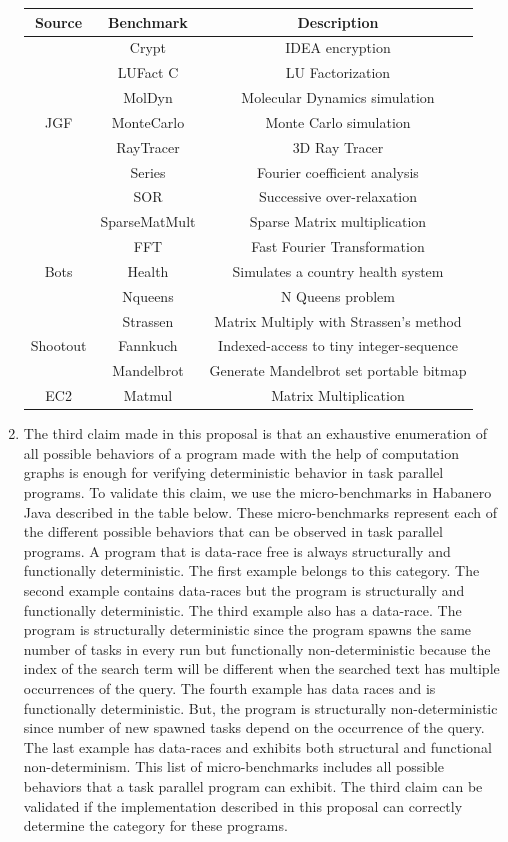 \begin{enumerate}
\begin{tabular}{|c|c|c|}
\hline
\textbf{Source} & \textbf{Benchmark} & \textbf{Description} \\
\hline
\hline
      & Crypt & IDEA encryption \\
	& LUFact C & LU Factorization \\
  	   & MolDyn & Molecular Dynamics simulation \\
JGF & MonteCarlo & Monte Carlo simulation \\
      & RayTracer & 3D Ray Tracer \\
      & Series & Fourier coefficient analysis \\
      & SOR & Successive over-relaxation \\
      & SparseMatMult & Sparse Matrix multiplication \\
      \hline
      & FFT  & Fast Fourier Transformation \\
	Bots & Health & Simulates a country health system \\
& Nqueens & N Queens problem \\
& Strassen & Matrix Multiply with Strassen’s method \\
\hline
Shootout & Fannkuch & Indexed-access to tiny integer-sequence \\
& Mandelbrot & Generate Mandelbrot set portable bitmap \\
\hline
EC2 & Matmul & Matrix Multiplication \\
\hline
\end{tabular}

\item The third claim made in this proposal is that an exhaustive enumeration of all possible behaviors of a program made with the help of computation graphs is enough for verifying deterministic behavior in task parallel programs. To validate this claim, we use the micro-benchmarks in Habanero Java described in the table below. These micro-benchmarks represent each of the different possible behaviors that can be observed in task parallel programs. A program that is data-race free is always structurally and functionally deterministic. The first example belongs to this category. The second example contains data-races but the program is structurally and functionally deterministic. The third example also has a data-race. The program is structurally deterministic since the program spawns the same number of tasks in every run but functionally non-deterministic because the index of the search term will be different when the searched text has multiple occurrences of the query. The fourth example has data races and is functionally deterministic. But, the program is structurally non-deterministic since number of new spawned tasks depend on the occurrence of the query. The last example has data-races and exhibits both structural and functional non-determinism. This list of micro-benchmarks includes all possible behaviors that a task parallel program can exhibit. The third claim can be validated if the implementation described in this proposal can correctly determine the category for these programs. 


\end{enumerate}
